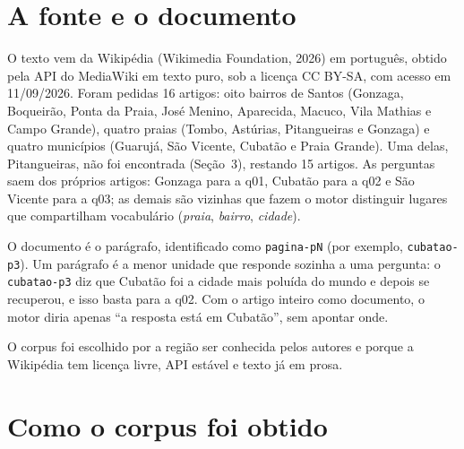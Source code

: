 \documentclass[
  article,
  12pt,
  oneside,
  a4paper,
  english,
  brazil
]{abntex2}
\begin{document}
\section{A fonte e o documento}

O texto vem da Wikipédia (Wikimedia Foundation, 2026) em português, obtido pela API do
MediaWiki em texto puro, sob a licença CC BY-SA, com acesso em
11/09/2026. Foram pedidas 16 artigos: oito bairros de Santos
(Gonzaga, Boqueirão, Ponta da Praia, José Menino, Aparecida, Macuco, Vila
Mathias e Campo Grande), quatro praias (Tombo, Astúrias, Pitangueiras e
Gonzaga) e quatro municípios (Guarujá, São Vicente, Cubatão e Praia Grande).
Uma delas, Pitangueiras, não foi encontrada (Seção~3), restando 15 artigos. As perguntas saem
dos próprios artigos: Gonzaga para a q01, Cubatão para a q02 e São Vicente
para a q03; as demais são vizinhas que fazem o motor distinguir lugares que
compartilham vocabulário (\emph{praia}, \emph{bairro}, \emph{cidade}).

O documento é o {parágrafo}, identificado como \texttt{pagina-pN} (por
exemplo, \texttt{cubatao-p3}). Um parágrafo é a menor unidade que responde
sozinha a uma pergunta: o \texttt{cubatao-p3} diz que Cubatão foi a cidade mais
poluída do mundo e depois se recuperou, e isso basta para a q02. Com o artigo
inteiro como documento, o motor diria apenas ``a resposta está em Cubatão'',
sem apontar onde.

O corpus foi escolhido por a região ser conhecida pelos autores e porque a Wikipédia tem licença
livre, API estável e texto já em prosa.

\section{Como o corpus foi obtido}
\end{document}
